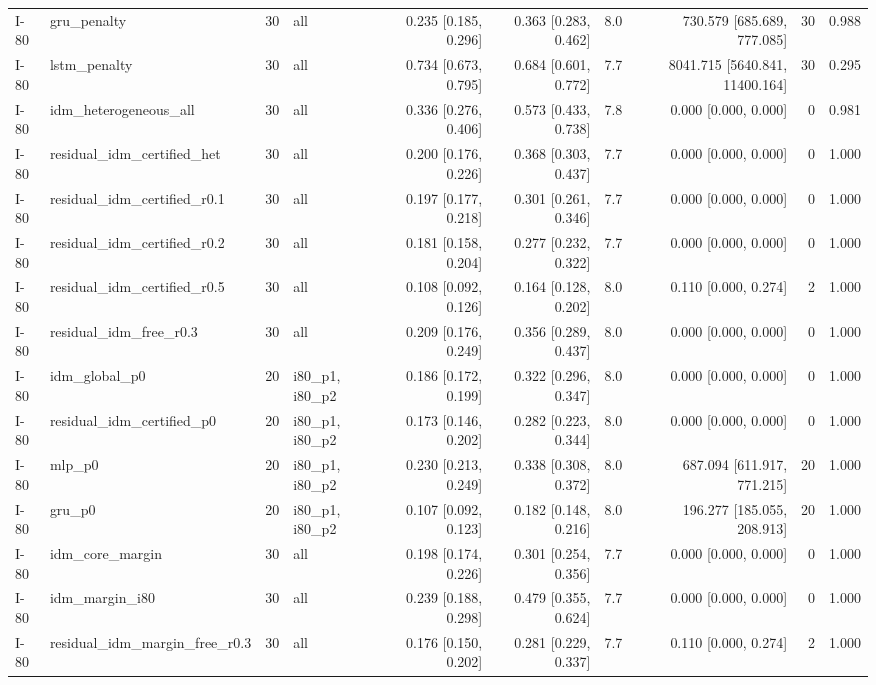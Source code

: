 \begin{table}[htbp]
{\begin{tabular}{llrlrrrrrr}
I-80 & gru\_penalty & 30 & all & 0.235 [0.185, 0.296] & 0.363 [0.283, 0.462] & 8.0 & 730.579 [685.689, 777.085] & 30 & 0.988 \\
I-80 & lstm\_penalty & 30 & all & 0.734 [0.673, 0.795] & 0.684 [0.601, 0.772] & 7.7 & 8041.715 [5640.841, 11400.164] & 30 & 0.295 \\
I-80 & idm\_heterogeneous\_all & 30 & all & 0.336 [0.276, 0.406] & 0.573 [0.433, 0.738] & 7.8 & 0.000 [0.000, 0.000] & 0 & 0.981 \\
I-80 & residual\_idm\_certified\_het & 30 & all & 0.200 [0.176, 0.226] & 0.368 [0.303, 0.437] & 7.7 & 0.000 [0.000, 0.000] & 0 & 1.000 \\
I-80 & residual\_idm\_certified\_r0.1 & 30 & all & 0.197 [0.177, 0.218] & 0.301 [0.261, 0.346] & 7.7 & 0.000 [0.000, 0.000] & 0 & 1.000 \\
I-80 & residual\_idm\_certified\_r0.2 & 30 & all & 0.181 [0.158, 0.204] & 0.277 [0.232, 0.322] & 7.7 & 0.000 [0.000, 0.000] & 0 & 1.000 \\
I-80 & residual\_idm\_certified\_r0.5 & 30 & all & 0.108 [0.092, 0.126] & 0.164 [0.128, 0.202] & 8.0 & 0.110 [0.000, 0.274] & 2 & 1.000 \\
I-80 & residual\_idm\_free\_r0.3 & 30 & all & 0.209 [0.176, 0.249] & 0.356 [0.289, 0.437] & 8.0 & 0.000 [0.000, 0.000] & 0 & 1.000 \\
I-80 & idm\_global\_p0 & 20 & i80\_p1, i80\_p2 & 0.186 [0.172, 0.199] & 0.322 [0.296, 0.347] & 8.0 & 0.000 [0.000, 0.000] & 0 & 1.000 \\
I-80 & residual\_idm\_certified\_p0 & 20 & i80\_p1, i80\_p2 & 0.173 [0.146, 0.202] & 0.282 [0.223, 0.344] & 8.0 & 0.000 [0.000, 0.000] & 0 & 1.000 \\
I-80 & mlp\_p0 & 20 & i80\_p1, i80\_p2 & 0.230 [0.213, 0.249] & 0.338 [0.308, 0.372] & 8.0 & 687.094 [611.917, 771.215] & 20 & 1.000 \\
I-80 & gru\_p0 & 20 & i80\_p1, i80\_p2 & 0.107 [0.092, 0.123] & 0.182 [0.148, 0.216] & 8.0 & 196.277 [185.055, 208.913] & 20 & 1.000 \\
I-80 & idm\_core\_margin & 30 & all & 0.198 [0.174, 0.226] & 0.301 [0.254, 0.356] & 7.7 & 0.000 [0.000, 0.000] & 0 & 1.000 \\
I-80 & idm\_margin\_i80 & 30 & all & 0.239 [0.188, 0.298] & 0.479 [0.355, 0.624] & 7.7 & 0.000 [0.000, 0.000] & 0 & 1.000 \\
I-80 & residual\_idm\_margin\_free\_r0.3 & 30 & all & 0.176 [0.150, 0.202] & 0.281 [0.229, 0.337] & 7.7 & 0.110 [0.000, 0.274] & 2 & 1.000 \\

\end{tabular}}
\end{table}
